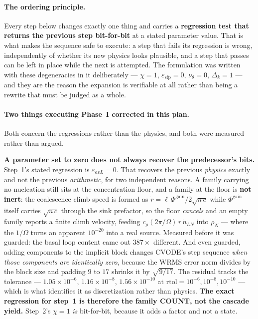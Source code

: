 \documentclass{article}
\begin{document}
\paragraph{The ordering principle.} Every step below changes exactly one thing
and carries a \textbf{regression test that returns the previous step
bit-for-bit} at a stated parameter value. That is what makes the sequence safe to
execute: a step that fails its regression is wrong, independently of whether its
new physics looks plausible, and a step that passes can be left in place while
the next is attempted. The formulation was written with these degeneracies in it
deliberately --- $\chi=1$, $\varepsilon_{\mathrm{sfp}}=0$, $\nu_\theta=0$,
$\Delta_k=1$ --- and they are the reason the expansion is verifiable at all
rather than being a rewrite that must be judged as a whole.

\paragraph{Two things executing Phase~I corrected in this plan.} Both concern the
regressions rather than the physics, and both were measured rather than argued.

\textbf{A parameter set to zero does not always recover the predecessor's bits.}
Step~1's stated regression is $\varepsilon_{avL}=0$. That recovers the previous
\emph{physics} exactly and not the previous \emph{arithmetic}, for two
independent reasons. A family carrying no nucleation still sits at the
concentration floor, and a family at the floor is \textbf{not inert}: the
coalescence climb speed is formed as
$\dot r=\ell\,\Phi^{\mathrm{gain}}/2\sqrt{n\,c}$ while $\Phi^{\mathrm{gain}}$
itself carries $\sqrt{n\,c}$ through the sink prefactor, so the floor
\emph{cancels} and an empty family reports a finite climb velocity, feeding
$c_{\rho}(2\pi/\Omega)\,r\,\dot n_{LN}$ into $\rho_N$ --- where the $1/\Omega$
turns an apparent $10^{-20}$ into a real source. Measured before it was guarded:
the basal loop content came out $387\times$ different. And even guarded, adding
components to the implicit block changes CVODE's step sequence \emph{when those
components are identically zero}, because the WRMS error norm divides by the
block size and padding $9$ to $17$ shrinks it by $\sqrt{9/17}$. The residual
tracks the tolerance --- $1.05\times10^{-6}$, $1.16\times10^{-8}$,
$1.56\times10^{-10}$ at $\mathrm{rtol}=10^{-6},10^{-8},10^{-10}$ --- which is
what identifies it as discretization rather than physics. \textbf{The exact
regression for step~1 is therefore the family COUNT, not the cascade yield.}
Step~2's $\chi=1$ \emph{is} bit-for-bit, because it adds a factor and not a
state.
\end{document}
